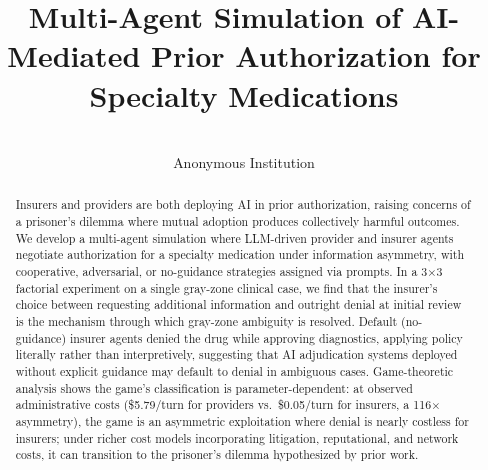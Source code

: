 \documentclass[pmlr,twocolumn,10pt]{jmlr}
\providecommand{\jmlrheading}[6]{}
\begin{document}
\jmlrheading{1}{2026}{1-XX}{X/XX}{XX/XX}{Author et al.}
\title{Multi-Agent Simulation of AI-Mediated Prior Authorization for Specialty Medications }
\author{ \\
\addr Anonymous Institution
}
\maketitle
\begin{abstract}
Insurers and providers are both deploying AI in prior authorization, raising concerns of a prisoner's dilemma where mutual adoption produces collectively harmful outcomes. We develop a multi-agent simulation where LLM-driven provider and insurer agents negotiate authorization for a specialty medication under information asymmetry, with cooperative, adversarial, or no-guidance strategies assigned via prompts. In a 3$\times$3 factorial experiment on a single gray-zone clinical case, we find that the insurer's choice between requesting additional information and outright denial at initial review is the mechanism through which gray-zone ambiguity is resolved. Default (no-guidance) insurer agents denied the drug while approving diagnostics, applying policy literally rather than interpretively, suggesting that AI adjudication systems deployed without explicit guidance may default to denial in ambiguous cases. Game-theoretic analysis shows the game's classification is parameter-dependent: at observed administrative costs (\$5.79/turn for providers vs.\ \$0.05/turn for insurers, a 116$\times$ asymmetry), the game is an asymmetric exploitation where denial is nearly costless for insurers; under richer cost models incorporating litigation, reputational, and network costs, it can transition to the prisoner's dilemma hypothesized by prior work.
\end{abstract}








\appendix

\end{document}
